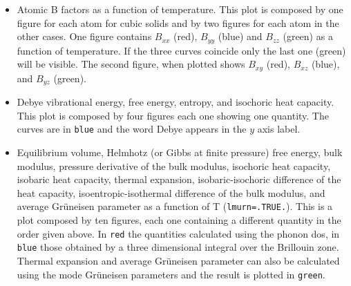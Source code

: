 \documentclass[12pt,a4paper]{article}
\begin{document}
\begin{itemize}
\item
Atomic B factors as a function of temperature. This plot is composed by
one figure for each atom for cubic solids and by two figures for each atom
in the other cases. One figure contains $B_{xx}$ (red), $B_{yy}$ (blue)
and $B_{zz}$ (green) as a function of temperature. If the three curves
coincide only the last one (green) will be visible. The second figure, 
when plotted shows $B_{xy}$ (red), $B_{xz}$ (blue), and $B_{yz}$ (green).

\item
Debye vibrational energy, free energy, 
entropy, and isochoric heat capacity. This plot is composed by four 
figures each one showing one quantity. The curves are in \texttt{blue}
and the word Debye appears in the $y$ axis label.
                                            
\item
Equilibrium volume, Helmhotz (or Gibbs at finite pressure) free energy, 
bulk modulus, pressure derivative of the bulk
modulus, isochoric heat capacity, isobaric heat capacity,
thermal expansion, isobaric-isochoric difference of the heat capacity,    
isoentropic-isothermal difference of the bulk modulus, and 
average Gr\"uneisen parameter as a function of T (\texttt{lmurn=.TRUE.}). 
This is a plot composed by ten figures, each one containing a different
quantity in the order given above. In \texttt{red} the quantities 
calculated using the phonon dos, in \texttt{blue} those
obtained by a three dimensional integral over the Brillouin zone.
Thermal expansion and average Gr\"uneisen parameter can also be 
calculated using the mode Gr\"uneisen parameters and the result is plotted in
\texttt{green}.


\end{itemize}
\end{document}
